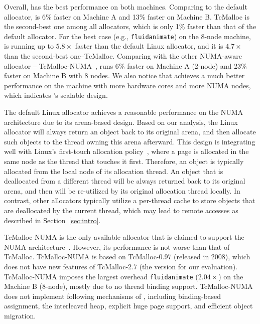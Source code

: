 Overall, \NM{} has the best performance on both machines. Comparing to the default allocator, \NM{} is 6\% faster on Machine A and 13\% faster on Machine B. TcMalloc is the second-best one among all allocators, which is only 1\% faster than that of the default allocator. For the best case (e.g., \texttt{fluidanimate}) on the 8-node machine, \NM{} is running up to  $5.8\times$ faster than the default Linux allocator, and it is $4.7\times$ than the second-best one--TcMalloc.  Comparing with the other NUMA-aware allocator -- TcMalloc-NUMA~\cite{tcmallocnew}, \NM{} runs 6\% faster on Machine A (2-node) and 23\% faster on Machine B with 8 nodes. We also notice that \NM{} achieves a much better performance on the machine with more hardware cores and more NUMA nodes, which indicates \NM{}'s scalable design. 

The default Linux allocator achieves a reasonable performance on the NUMA architecture due to its arena-based design. Based on our analysis, the Linux allocator will always return an object back to its original arena, and then allocate such objects to the thread owning this arena afterward. This design is integrating well with Linux's first-touch allocation policy~\cite{Lameter:2013:NO:2508834.2513149}, where a page is allocated in the same node as the thread that touches it first. Therefore, an object is typically allocated from the local node of its allocation thread. An object that is deallocated from a different thread will be always returned back to its original arena, and then will be re-utilized by its original allocation thread locally. In contrast, other allocators typically utilize a per-thread cache to store objects that are deallocated by the current thread, which may lead to remote accesses as described in Section~\ref{sec:intro}. 

 TcMalloc-NUMA is the only available allocator that is claimed to support the NUMA architecture~\cite{tcmallocnew}. However, its performance is not worse than that of TcMalloc. TcMalloc-NUMA is based on TcMalloc-0.97 (released in 2008), which does not have new features of TcMalloc-2.7 (the version for our evaluation). TcMalloc-NUMA imposes the largest overhead \texttt{fluidanimate} ($2.04\times$) on the Machine B (8-node), mostly due to no thread binding support.  TcMalloc-NUMA does not implement following mechanisms of \NM{}, including binding-based assignment, the interleaved heap, explicit huge page support, and efficient object migration. 
  


